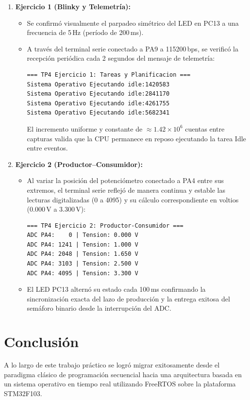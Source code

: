 \documentclass{plantilla}
\begin{document}
\begin{enumerate}
    \item \textbf{Ejercicio 1 (Blinky y Telemetría):}
    \begin{itemize}
        \item Se confirmó visualmente el parpadeo simétrico del LED en PC13 a una frecuencia de 5\,Hz (período de 200\,ms).
        \item A través del terminal serie conectado a PA9 a 115200\,bps, se verificó la recepción periódica cada 2 segundos del mensaje de telemetría:
        \begin{lstlisting}
=== TP4 Ejercicio 1: Tareas y Planificacion ===
Sistema Operativo Ejecutando idle:1420583
Sistema Operativo Ejecutando idle:2841170
Sistema Operativo Ejecutando idle:4261755
Sistema Operativo Ejecutando idle:5682341
        \end{lstlisting}
        El incremento uniforme y constante de $\approx 1.42 \times 10^6$ cuentas entre capturas valida que la CPU permanece en reposo ejecutando la tarea Idle entre eventos.
    \end{itemize}
    \item \textbf{Ejercicio 2 (Productor--Consumidor):}
    \begin{itemize}
        \item Al variar la posición del potenciómetro conectado a PA4 entre sus extremos, el terminal serie reflejó de manera continua y estable las lecturas digitalizadas (0 a 4095) y su cálculo correspondiente en voltios (0.000\,V a 3.300\,V):
        \begin{lstlisting}
=== TP4 Ejercicio 2: Productor-Consumidor ===
ADC PA4:    0 | Tension: 0.000 V
ADC PA4: 1241 | Tension: 1.000 V
ADC PA4: 2048 | Tension: 1.650 V
ADC PA4: 3103 | Tension: 2.500 V
ADC PA4: 4095 | Tension: 3.300 V
        \end{lstlisting}
        \item El LED PC13 alternó su estado cada 100\,ms confirmando la sincronización exacta del lazo de producción y la entrega exitosa del semáforo binario desde la interrupción del ADC.
    \end{itemize}
\end{enumerate}

\section{Conclusión}
A lo largo de este trabajo práctico se logró migrar exitosamente desde el paradigma clásico de programación secuencial hacia una arquitectura basada en un sistema operativo en tiempo real utilizando FreeRTOS sobre la plataforma STM32F103.
\end{document}
